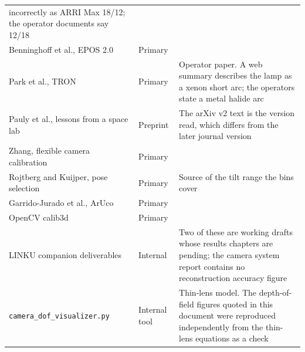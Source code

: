 \begin{longtable}{@{}p{} p{} p{}@{}}
  incorrectly as ARRI Max 18/12; the operator documents say 12/18 \\
Benninghoff et al., EPOS 2.0 \cite{benninghoff2017epos} & Primary & \\
Park et al., TRON \cite{park2021tron} & Primary & Operator paper. A web
  summary describes the lamp as a xenon short arc; the operators state a
  metal halide arc \\
Pauly et al., lessons from a space lab \cite{pauly2022spacelab} & Preprint &
  The arXiv v2 text is the version read, which differs from the later
  journal version \\
Zhang, flexible camera calibration \cite{zhang2000flexible} & Primary & \\
Rojtberg and Kuijper, pose selection \cite{rojtberg2018pose} & Primary &
  Source of the tilt range the bins cover \\
Garrido-Jurado et al., ArUco \cite{garrido2014aruco} & Primary & \\
OpenCV calib3d \cite{opencv_calib3d} & Primary & \\
LINKU companion deliverables
  \cite{linku_d5_camera_report, linku_darkroom_illumination,
  linku_calibration_method, linku_rollingshutter,
  linku_blender_validation, linku_workplan} & Internal & Two of these are
  working drafts whose results chapters are pending; the camera system
  report contains no reconstruction accuracy figure \\
\texttt{camera\_dof\_visualizer.py} \cite{linku_dof_visualizer} & Internal
  tool & Thin-lens model. The depth-of-field figures quoted in this document
  were reproduced independently from the thin-lens equations as a check \\
\bottomrule
\end{longtable}
